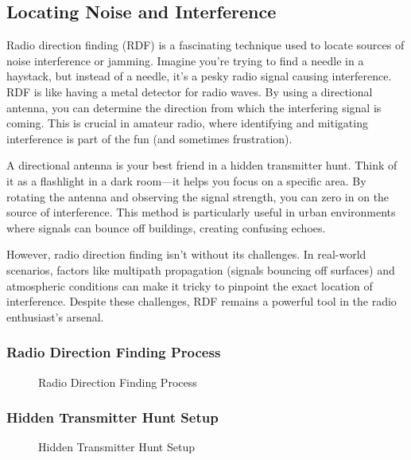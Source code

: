 \subsection{Locating Noise and Interference}
\label{subsec:locating-noise}

Radio direction finding (RDF) is a fascinating technique used to locate sources of noise interference or jamming. Imagine you're trying to find a needle in a haystack, but instead of a needle, it's a pesky radio signal causing interference. RDF is like having a metal detector for radio waves. By using a directional antenna, you can determine the direction from which the interfering signal is coming. This is crucial in amateur radio, where identifying and mitigating interference is part of the fun (and sometimes frustration).

A directional antenna is your best friend in a hidden transmitter hunt. Think of it as a flashlight in a dark room—it helps you focus on a specific area. By rotating the antenna and observing the signal strength, you can zero in on the source of interference. This method is particularly useful in urban environments where signals can bounce off buildings, creating confusing echoes.

However, radio direction finding isn't without its challenges. In real-world scenarios, factors like multipath propagation (signals bouncing off surfaces) and atmospheric conditions can make it tricky to pinpoint the exact location of interference. Despite these challenges, RDF remains a powerful tool in the radio enthusiast's arsenal.

\subsubsection*{Radio Direction Finding Process}
\begin{figure}[h]
    \centering
    \caption{Radio Direction Finding Process}
    \label{fig:radio-direction-finding}
\end{figure}

\subsubsection*{Hidden Transmitter Hunt Setup}
\begin{figure}[h]
    \centering
    \caption{Hidden Transmitter Hunt Setup}
    \label{fig:hidden-transmitter-hunt}
\end{figure}

